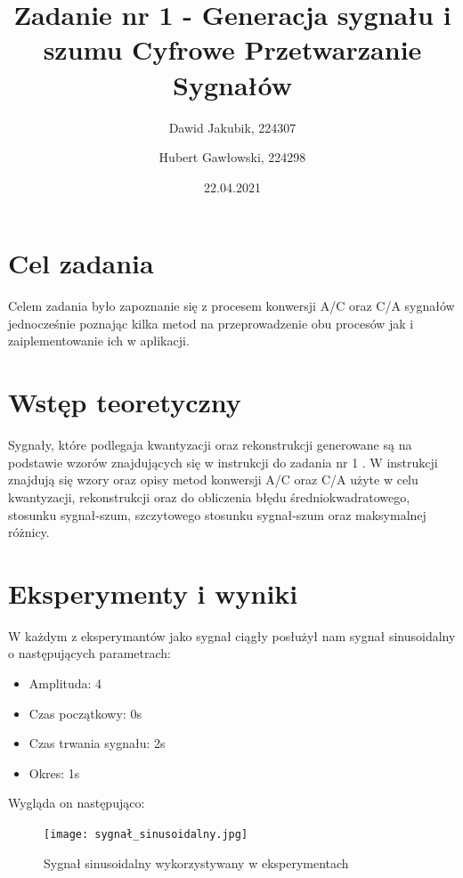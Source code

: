 \documentclass[12pt]{article}
\title{{\bf Zadanie nr 1 - Generacja sygnału i szumu}\linebreak
Cyfrowe Przetwarzanie Sygnałów}
\author{Dawid Jakubik, 224307 \and Hubert Gawłowski, 224298}
\date{22.04.2021}
\begin{document}
\clearpage\maketitle
\thispagestyle{empty}
\newpage
\setcounter{page}{1}
\section{Cel zadania}

Celem zadania było zapoznanie się z procesem konwersji A/C oraz C/A sygnałów jednocześnie poznając kilka metod na przeprowadzenie obu procesów jak i zaiplementowanie ich w aplikacji. 

\section{Wstęp teoretyczny}

Sygnały, które podlegaja kwantyzacji oraz rekonstrukcji generowane są na podstawie wzorów znajdujących się w instrukcji do zadania nr 1 \cite{instrukcja1}. W instrukcji \cite{instrukcja2} znajdują się wzory oraz opisy metod konwersji A/C oraz C/A użyte w celu kwantyzacji, rekonstrukcji oraz do obliczenia błędu średniokwadratowego, stosunku sygnał-szum, szczytowego stosunku sygnał-szum oraz maksymalnej różnicy.


\section{Eksperymenty i wyniki}

W każdym z eksperymantów jako sygnał ciągły posłużył nam sygnał sinusoidalny o następujących parametrach: 
\begin{itemize}
	\item Amplituda: 4
	\item Czas początkowy: 0s
	\item Czas trwania sygnału: 2s
	\item Okres: 1s
\end{itemize}
Wygląda on następująco:
\begin{figure}[H]
    \centering
	\texttt{[image: sygnał\_sinusoidalny.jpg]}
    \caption{Sygnał sinusoidalny wykorzystywany w eksperymentach}
    \label{wykres dla eksperymentu 1}
\end{figure}
\end{document}
